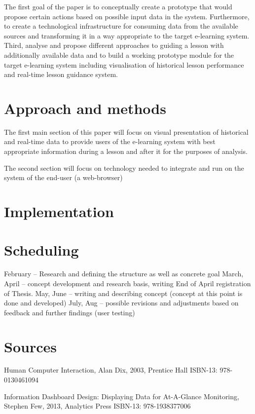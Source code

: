The first goal of the paper is to conceptually create a prototype that would propose certain actions based on possible input data in the system. Furthermore, to create a technological infrastructure for consuming data from the available sources and transforming it in a way appropriate to the target e-learning system. Third, analyse and propose different approaches to guiding a lesson with additionally available data and to build a working prototype module for the target e-learning system including visualisation of historical lesson performance and real-time lesson guidance system.

\section{Approach and methods}

The first main section of this paper will focus on visual presentation of historical and real-time data to provide users of the e-learning system with best appropriate information during a lesson and after it for the purposes of analysis.

The second section will focus on technology needed to integrate and run on the system of the end-user (a web-browser)

\section{Implementation}

\section{Scheduling}
February – Research and defining the structure as well as concrete goal
March, April – concept development and research basis, writing
End of April registration of Thesis.
May, June – writing and describing concept (concept at this point is done and developed)
July, Aug – possible revisions and adjustments based on feedback and further findings (user testing)

\section{Sources}

Human Computer Interaction, Alan Dix, 2003, Prentice Hall
ISBN-13: 978-0130461094

Information Dashboard Design: Displaying Data for At-A-Glance Monitoring, Stephen Few, 2013, Analytics Press
ISBN-13: 978-1938377006

